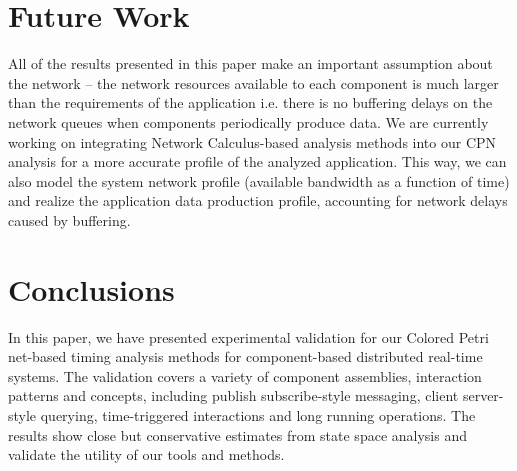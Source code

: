 \section{Future Work}
\label{sec:Future-Work}

All of the results presented in this paper make an important assumption about the network -- the network resources available to each component is much larger than the requirements of the application i.e. there is no buffering delays on the network queues when components periodically produce data. We are currently working on integrating Network Calculus-based analysis methods \cite{ISIS_F6_CYPHY:14} into our CPN analysis for a more accurate profile of the analyzed application. This way, we can also model the system network profile (available bandwidth as a function of time) and realize the application data production profile, accounting for network delays caused by buffering. 

\section{Conclusions}
\label{sec:Conclusions}

In this paper, we have presented experimental validation for our Colored Petri net-based timing analysis methods for component-based distributed real-time systems. The validation covers a variety of component assemblies, interaction patterns and concepts, including publish subscribe-style messaging, client server-style querying, time-triggered interactions and long running operations. The results show close but conservative estimates from state space analysis and validate the utility of our tools and methods. 